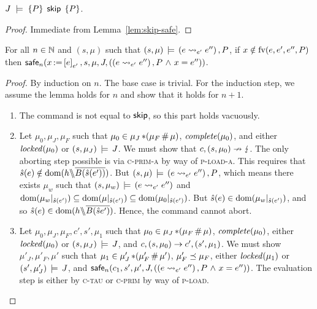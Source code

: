 \documentclass[11pt]{report}
\begin{document}
\begin{lemma}
	\label{lem:skip-sound}
	$J\;\models\;\left\lbrace P \right\rbrace\;\operatorname{\mathsf{skip}}\;\left\lbrace P \right\rbrace$. 
\end{lemma}

\begin{proof}
	Immediate from Lemma~\ref{lem:skip-safe}. 
\end{proof}

\begin{lemma}
	\label{lem:load-safe}
	For all $n \in \mathbb{N}$ and $(s,\mu)$ such that $(s,\mu) \,\models\, (e \leadsto_{e'} e'') \operatorname{,} P$, if $x \notin \mathrm{fv}(e,e',e'',P)$ then $\mathsf{safe}_{n}(x \operatorname{:\!=} \left[ e \right]_{e'},s,\mu,J,\left((e \leadsto_{e'} e'') \operatorname{,} P \operatorname{\,\wedge\,} x = e''\right))$. 
\end{lemma}

\begin{proof}
	By induction on $n$. The base case is trivial. For the induction step, we assume the lemma holds for $n$ and show that it holds for $n+1$.

	\begin{enumerate}
		\item The command is not equal to $\operatorname{\mathsf{skip}}$, so this part holds vacuously. 

		\item Let $\mu_0,\mu_J,\mu_F$ such that $\mu_0 \in \mu_J \operatorname{\ast} (\mu_F \operatorname{\#} \mu)$, $\mathit{complete}(\mu_0)$, and either $\mathit{locked}(\mu_0)$ or $(s,\mu_J) \,\models\, J$. We must show that $c,(s,\mu_0) \nrightarrow \lightning$. The only aborting step possible is via \textsc{c-prim-a} by way of \textsc{p-load-a}. This requires that $\hat{s}(e) \notin \operatorname{\mathrm{dom}}(h \backslash\!\!\backslash \overline{B(\hat{s}(e'))})$. But $(s,\mu) \,\models\, (e \leadsto_{e'} e'') \operatorname{,} P$, which means there exists $\mu_w$ such that $(s,\mu_w) \,\models\, (e \leadsto_{e'} e'')$ and $\operatorname{\mathrm{dom}}(\mu_w |_{\hat{s}(e')}) \subseteq \operatorname{\mathrm{dom}}(\mu |_{\hat{s}(e')}) \subseteq \operatorname{\mathrm{dom}}(\mu_0 |_{\hat{s}(e')})$. But $\hat{s}(e) \in \operatorname{\mathrm{dom}}(\mu_w |_{\hat{s}(e')})$, and so $\hat{s}(e) \in \operatorname{\mathrm{dom}}(h \backslash\!\!\backslash \overline{B(\hat{s}e')})$. Hence, the command cannot abort. 

		\item Let $\mu_0,\mu_J,\mu_F,c',s',\mu_1$ such that $\mu_0 \in \mu_J \operatorname{\ast} (\mu_F \operatorname{\#} \mu)$, $\mathit{complete}(\mu_0)$, either $\mathit{locked}(\mu_0)$ or $(s,\mu_J) \,\models\, J$, and $c,(s,\mu_0) \rightarrow c',(s',\mu_1)$. We must show $\mu'_J,\mu'_F,\mu'$ such that $\mu_1 \in \mu'_J \operatorname{\ast} (\mu'_F \operatorname{\#} \mu')$, $\mu'_F \preceq \mu_F$, either $\mathit{locked}(\mu_1)$ or $(s',\mu'_J) \,\models\, J$, and $\mathsf{safe}_{n}(c_1,s',\mu',J,((e \leadsto_{e'} e'') \operatorname{,} P \operatorname{\,\wedge\,} x = e''))$. The evaluation step is either by \textsc{c-tau} or \textsc{c-prim} by way of \textsc{p-load}. 


\end{enumerate}
\end{proof}
\end{document}
